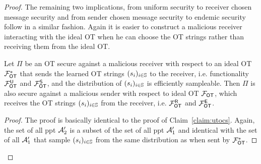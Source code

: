 \begin{proof}
	The remaining two implications, from uniform security to receiver chosen message security and from sender chosen message security to endemic security follow in a similar fashion. Again it is easier to construct a malicious receiver interacting with the ideal OT when he can choose the OT strings rather than receiving them from the ideal OT.
	\begin{claim}\label{claim:utocr}
		Let $\Pi$ be an OT secure against a malicious receiver with respect to an ideal OT $\mathcal{F}_{\mathsf{OT}}^*$ that sends the learned OT strings $(s_i)_{i\in\mathsf{\mathbb S}}$ to the receiver, i.e. functionality $\mathcal{F}_{\mathsf{OT}}^\mathsf{U}$ and $\mathcal{F}_{\mathsf{OT}}^{\mathsf{S}}$, and the distribution of $(s_i)_{i\in\mathsf{\mathbb S}}$ is efficiently sampleable. Then $\Pi$ is also secure against a malicious sender with respect to ideal OT $\mathcal{F}_{\mathsf{OT}}$, which receives the OT strings $(s_i)_{i\in\mathsf{\mathbb S}}$ from the receiver, i.e. $\mathcal{F}_{\mathsf{OT}}^\mathsf{R}$ and $\mathcal{F}_{\mathsf{OT}}^\mathsf{E}$.
	\end{claim}
	
	\begin{proof}
		The proof is basically identical to the proof of Claim~\ref{claim:utocs}. Again, the set of all ppt $\mathcal{A}_2'$ is a subset of the set of all ppt $\mathcal{A}_1'$ and identical with the set of all $\mathcal{A}_1'$ that sample  $(s_i)_{i\in\mathsf{\mathbb S}}$ from the same distribution as when sent by $\mathcal{F}_{\mathsf{OT}}^*$.
		\pe
	\end{proof}
	\pe
\end{proof}

